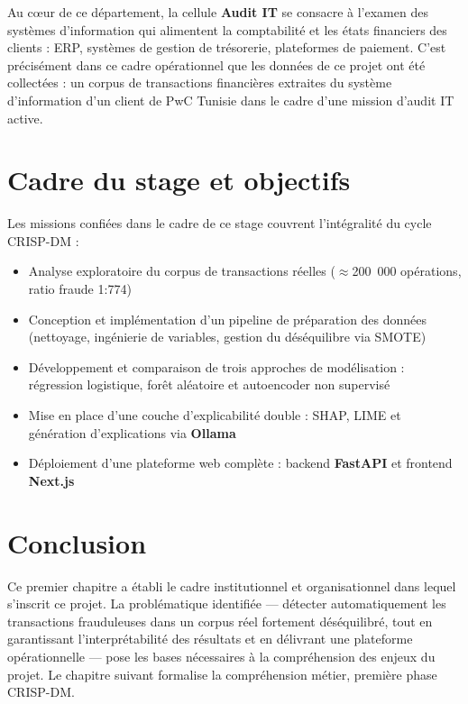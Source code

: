 \documentclass[12pt,a4paper,twoside]{report}
\begin{document}
Au cœur de ce département, la cellule \textbf{Audit IT} se consacre à l'examen des systèmes d'information qui alimentent la comptabilité et les états financiers des clients : ERP, systèmes de gestion de trésorerie, plateformes de paiement. C'est précisément dans ce cadre opérationnel que les données de ce projet ont été collectées : un corpus de transactions financières extraites du système d'information d'un client de PwC Tunisie dans le cadre d'une mission d'audit IT active.

\section{Cadre du stage et objectifs}

Les missions confiées dans le cadre de ce stage couvrent l'intégralité du cycle CRISP-DM :

\begin{itemize}
  \item Analyse exploratoire du corpus de transactions réelles ($\approx$200~000 opérations, ratio fraude 1:774)
  \item Conception et implémentation d'un pipeline de préparation des données (nettoyage, ingénierie de variables, gestion du déséquilibre via SMOTE)
  \item Développement et comparaison de trois approches de modélisation : régression logistique, forêt aléatoire et autoencoder non supervisé
  \item Mise en place d'une couche d'explicabilité double : SHAP, LIME et génération d'explications via \textbf{Ollama}
  \item Déploiement d'une plateforme web complète : backend \textbf{FastAPI} et frontend \textbf{Next.js}
\end{itemize}

\section*{Conclusion}

Ce premier chapitre a établi le cadre institutionnel et organisationnel dans lequel s'inscrit ce projet. La problématique identifiée --- détecter automatiquement les transactions frauduleuses dans un corpus réel fortement déséquilibré, tout en garantissant l'interprétabilité des résultats et en délivrant une plateforme opérationnelle --- pose les bases nécessaires à la compréhension des enjeux du projet. Le chapitre suivant formalise la compréhension métier, première phase CRISP-DM.
\end{document}
